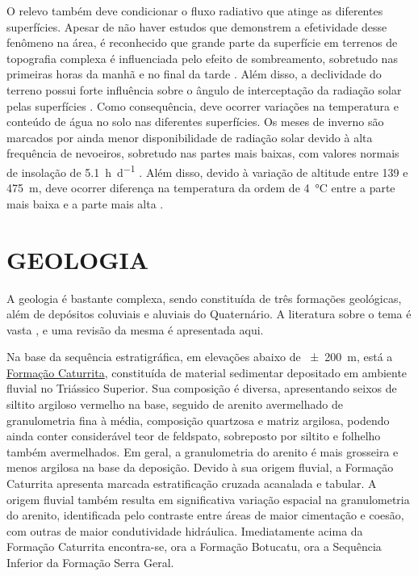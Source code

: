 O relevo também deve condicionar o fluxo radiativo que atinge as diferentes superfícies. Apesar de não haver 
estudos que demonstrem a efetividade desse fenômeno na área, é reconhecido que grande parte da superfície em 
terrenos de topografia complexa é influenciada pelo efeito de sombreamento, sobretudo nas primeiras horas da 
manhã e no final da tarde \cite{OliphantEtAl2003}. Além disso, a declividade do terreno possui forte 
influência sobre o ângulo de interceptação da radiação solar pelas superfícies \cite{Birkeland1999}. Como 
consequência, deve ocorrer variações na temperatura e conteúdo de água no solo nas diferentes superfícies. Os 
meses de inverno são marcados por ainda menor disponibilidade de radiação solar devido à alta frequência de 
nevoeiros, sobretudo nas partes mais baixas, com valores normais de insolação de \SI{5,1}{\hour\per\day} 
\cite{HeldweinEtAl2009}. Além disso, devido à variação de altitude entre \num{139} e \SI{475}{\metre}, deve 
ocorrer diferença na temperatura da ordem de \SI{4}{\celsius} entre a parte mais baixa e a parte mais alta 
\cite{HeldweinEtAl2009}.

\section{GEOLOGIA}
\label{sec:chap03-geologia}

A geologia é bastante complexa, sendo constituída de três formações geológicas, além de depósitos coluviais 
e aluviais do Quaternário. A literatura sobre o tema é vasta \cite{Bortoluzzi1974, Brasil1980, 
GasparettoEtAl1988, MacielFilho1990, Machado1998, PieriniEtAl2002, MarquesEtAl2005, Milani2005, Pinto2005, 
CPRM2007, Pedron2007, Sartori2009, NascimentoEtAl2010, WerlangEtAl2010, PedronEtAl2012}, e uma revisão da 
mesma é apresentada aqui.

\def\caturrita{\href{https://pt.wikipedia.org/wiki/Forma\%C3\%A7\%C3\%A3o_Caturrita}{Formação Caturrita}}

Na base da sequência estratigráfica, em elevações abaixo de \SI{\pm200}{\metre}, está a \caturrita{}, 
constituída de material sedimentar depositado em ambiente fluvial no Triássico Superior. Sua composição é 
diversa, apresentando seixos de siltito argiloso vermelho na base, seguido de arenito avermelhado de 
granulometria fina à média, composição quartzosa e matriz argilosa, podendo ainda conter considerável teor de 
feldspato, sobreposto por siltito e folhelho também avermelhados. Em geral, a granulometria do arenito é mais 
grosseira e menos argilosa na base da deposição. Devido à sua origem fluvial, a Formação Caturrita apresenta 
marcada estratificação cruzada acanalada e tabular. A origem fluvial também resulta em significativa variação 
espacial na granulometria do arenito, identificada pelo contraste entre áreas de maior cimentação e coesão, 
com outras de maior condutividade hidráulica. Imediatamente acima da Formação Caturrita encontra-se, ora a 
Formação Botucatu, ora a Sequência Inferior da Formação Serra Geral.

